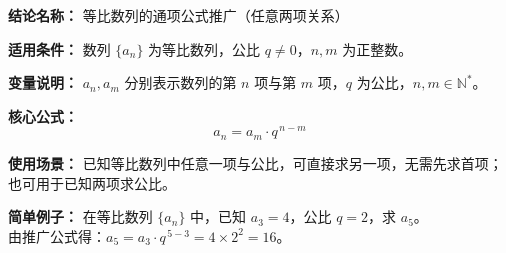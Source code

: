 \textbf{结论名称：} 等比数列的通项公式推广（任意两项关系）

\textbf{适用条件：} 数列 $\{a_n\}$ 为等比数列，公比 $q \neq 0$，$n,m$ 为正整数。

\textbf{变量说明：} $a_n, a_m$ 分别表示数列的第 $n$ 项与第 $m$ 项，$q$ 为公比，$n,m \in \mathbb{N}^*$。

\textbf{核心公式：}
\[
\boxed{a_n = a_m \cdot q^{\,n-m}}
\]

\textbf{使用场景：} 已知等比数列中任意一项与公比，可直接求另一项，无需先求首项；也可用于已知两项求公比。

\textbf{简单例子：} 在等比数列 $\{a_n\}$ 中，已知 $a_3=4$，公比 $q=2$，求 $a_5$。\\
由推广公式得：$a_5 = a_3 \cdot q^{\,5-3} = 4 \times 2^2 = 16$。
